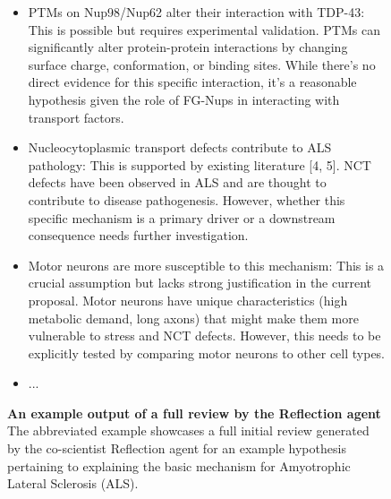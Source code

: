 \begin{figure}[htbp!]
\begin{tcolorbox}
\begin{itemize}
    \item PTMs on Nup98/Nup62 alter their interaction with TDP-43: This is possible but requires experimental validation. PTMs can significantly alter protein-protein interactions by changing surface charge, conformation, or binding sites. While there's no direct evidence for this specific interaction, it's a reasonable hypothesis given the role of FG-Nups in interacting with transport factors.
    \item Nucleocytoplasmic transport defects contribute to ALS pathology: This is supported by existing literature [4, 5]. NCT defects have been observed in ALS and are thought to contribute to disease pathogenesis. However, whether this specific mechanism is a primary driver or a downstream consequence needs further investigation.
    \item Motor neurons are more susceptible to this mechanism: This is a crucial assumption but lacks strong justification in the current proposal. Motor neurons have unique characteristics (high metabolic demand, long axons) that might make them more vulnerable to stress and NCT defects. However, this needs to be explicitly tested by comparing motor neurons to other cell types.
    \item ...
\end{itemize}
\end{tcolorbox}
\vspace{0.1cm}
\caption{\textbf{An example output of a full review by the Reflection agent} The abbreviated example showcases a full initial review generated by the co-scientist Reflection agent for an example hypothesis pertaining to explaining the basic mechanism for Amyotrophic Lateral Sclerosis (ALS).}
\label{fig:ex_reflection_basic}
\end{figure}


